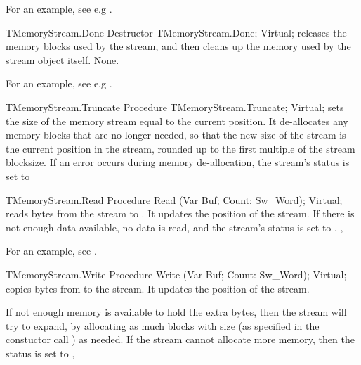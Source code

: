 For an example, see e.g .

\begin{procedure}{TMemoryStream.Done}
\Declaration
Destructor TMemoryStream.Done; Virtual;
\Description
{} releases the memory blocks used by the stream, and then cleans up
the memory used by the stream object itself.
\Errors
None.
\SeeAlso
{}
\end{procedure}

For an example, see e.g .

\begin{procedure}{TMemoryStream.Truncate}
\Declaration
Procedure TMemoryStream.Truncate; Virtual;
\Description
{} sets the size of the memory stream equal to the current
position. It de-allocates any memory-blocks that are no longer needed, so
that the new size of the stream is the current position in the stream,
rounded up to the first multiple of the stream blocksize.
\Errors 
If an error occurs during memory de-allocation, the stream's status is set
to 
\SeeAlso
{}
\end{procedure}

\html{}

\begin{procedure}{TMemoryStream.Read}
\Declaration
Procedure Read (Var Buf; Count: Sw\_Word); Virtual;
\Description
{} reads  bytes from the stream to . It updates
the position of the stream.
\Errors
If there is not enough data available, no data is read, and the stream's
status is set to .
\SeeAlso
{}, 
\end{procedure}

For an example, see .

\begin{procedure}{TMemoryStream.Write}
\Declaration
Procedure Write (Var Buf; Count: Sw\_Word); Virtual;
\Description
{} copies  bytes from  to the stream. It
updates the position of the stream. 

If not enough memory is available to hold the extra  bytes, 
then the stream will try to expand, by allocating as much blocks with 
size  (as specified in the constuctor call
) as needed. 
\Errors
If the stream cannot allocate more memory, then the status is set to
\SeeAlso
{}, 
\end{procedure}

